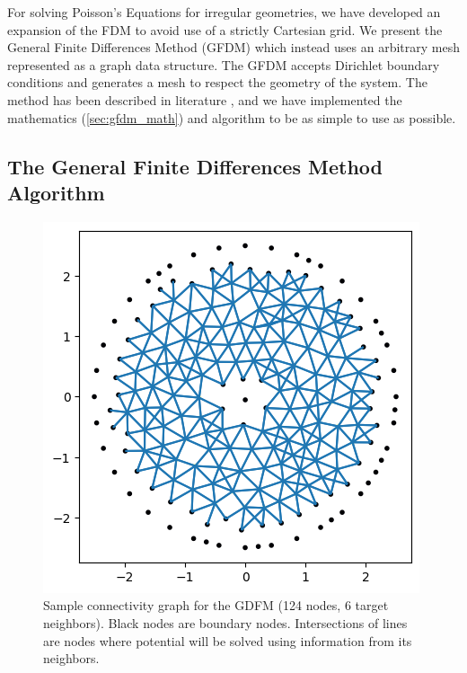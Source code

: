 \documentclass{PoS}
\begin{document}
For solving Poisson's Equations for irregular geometries, we have developed an expansion of the FDM to avoid use of a strictly Cartesian grid. We present the General Finite Differences Method (GFDM) which instead uses an arbitrary mesh represented as a graph data structure. The GFDM accepts Dirichlet boundary conditions and generates a mesh to respect the geometry of the system. The method has been described in literature \cite{PERRONE197545} \cite{KAMYABI2019233}, and we have implemented the mathematics (\ref{sec:gfdm_math}) and algorithm to be as simple to use as possible.

\subsection{The General Finite Differences Method Algorithm}
\begin{figure}
    \centering
    \includegraphics[width=0.9\linewidth]{Figures/GFDM/Coax_GFDM_Connectivity.png}
    \caption{Sample connectivity graph for the GDFM (124 nodes, 6 target neighbors). Black nodes are boundary nodes. Intersections of lines are nodes where potential will be solved using information from its neighbors.}
    \label{fig:coax_gfdm_connectivity}
\end{figure}
\end{document}
